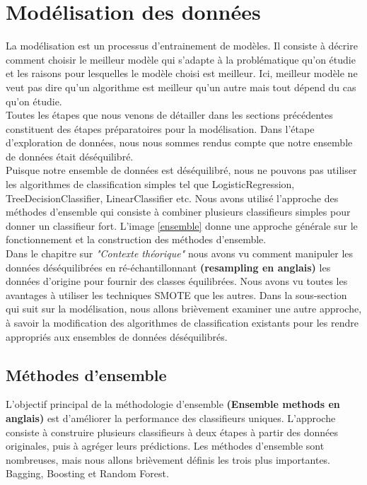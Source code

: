 \documentclass[12pt, french]{report}
\begin{document}
 


\section{Modélisation des données}

La modélisation est un processus d'entrainement de modèles. Il consiste à décrire comment choisir le meilleur modèle qui s'adapte à la problématique qu'on étudie et les raisons pour lesquelles le modèle choisi est meilleur. Ici, meilleur modèle ne veut pas dire qu'un algorithme est meilleur qu'un autre mais tout dépend du cas qu'on étudie.\\

Toutes les étapes que nous venons de détailler dans les sections précédentes constituent des étapes préparatoires pour la modélisation. Dans l'étape d'exploration de données, nous nous sommes rendus compte que notre ensemble de données était déséquilibré. \\ 

Puisque notre ensemble de données est déséquilibré, nous ne pouvons pas utiliser les algorithmes de classification simples tel que LogisticRegression, TreeDecisionClassifier, LinearClassifier etc. Nous avons utilisé l'approche des méthodes d'ensemble qui consiste à combiner plusieurs classifieurs simples pour donner un classifieur fort. L'image \ref{ensemble} donne une approche générale sur le fonctionnement et la construction des méthodes d'ensemble. \\

Dans le chapitre sur \textit{"Contexte théorique"} nous avons vu comment manipuler les données déséquilibrées en ré-échantillonnant \textbf{(resampling en anglais)} les données d'origine pour fournir des classes équilibrées. Nous avons vu toutes les avantages à utiliser les techniques SMOTE que les autres. Dans la sous-section qui suit sur la modélisation, nous allons brièvement examiner une autre approche, à savoir la modification des algorithmes de classification existants pour les rendre appropriés aux ensembles de données déséquilibrés. 



\subsection{Méthodes d'ensemble}

L'objectif principal de la méthodologie d'ensemble \textbf{(Ensemble methods en anglais)} \cite{key1} est d'améliorer la performance des classifieurs uniques. L'approche consiste à construire plusieurs classifieurs à deux étapes à partir des données originales, puis à agréger leurs prédictions. Les méthodes d'ensemble sont nombreuses, mais nous allons brièvement définis les trois plus importantes. Bagging, Boosting et Random Forest. 
\end{document}
